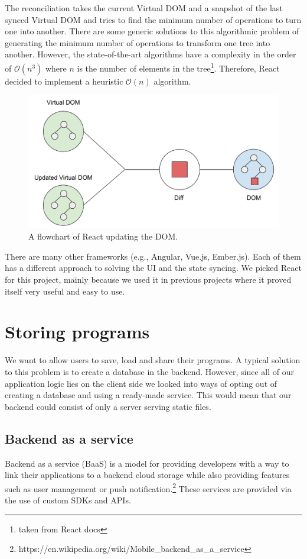 The reconciliation takes the current Virtual DOM and a snapshot of the last synced Virtual DOM and tries to find the minimum number of operations to turn
one into another. There are some generic solutions to this algorithmic problem of generating the minimum number of operations to transform one tree into another.
However, the state-of-the-art algorithms \cite{TreeEditDistance} have a complexity in the order of $\mathcal{O}(n^3)$ where $n$ is the number of elements in
the tree\footnote{taken from React docs}. Therefore, React decided to implement a heuristic $\mathcal{O}(n)$ algorithm.

\begin{figure}[!hbt]
    \centering
	\includegraphics[width=\textwidth]{../img/virtual_dom}
	\caption{A flowchart of React updating the DOM.}
	\label{fig:chap2:virtual_dom}
\end{figure}

There are many other frameworks (e.g., Angular, Vue.js, Ember.js). Each of them has a different approach to solving the UI and the state syncing. We picked
React for this project, mainly because we used it in previous projects where it proved itself very useful and easy to use.

\section{Storing programs}
We want to allow users to save, load and share their programs. A typical solution to this problem is to create a database in the backend. However, since all
of our application logic lies on the client side we looked into ways of opting out of creating a database and using a ready-made service. This would mean that
our backend could consist of only a server serving static files.

\subsection{Backend as a service}
Backend as a service (BaaS) is a model for providing developers with a way to link their applications to a backend cloud storage while also providing features
such as user management or push notification.\footnote{https://en.wikipedia.org/wiki/Mobile\_backend\_as\_a\_service} These services are provided via
the use of custom SDKs and APIs.

